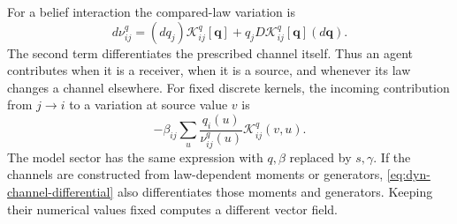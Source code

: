 For a belief interaction the compared-law variation is
\begin{equation}
 d\nu^q_{ij}
 =(dq_j)\mathcal K^q_{ij}[\mathbf q]
  +q_jD\mathcal K^q_{ij}[\mathbf q](d\mathbf q).
 \label{eq:dyn-channel-differential}
\end{equation}
The second term differentiates the prescribed channel itself. Thus an agent contributes when it is a receiver, when it is a source, and whenever its law changes a channel elsewhere. For fixed discrete kernels, the incoming contribution from $j\to i$ to a variation at source value $v$ is
\begin{equation}
 -\beta_{ij}\sum_u
 \frac{q_i(u)}{\nu^q_{ij}(u)}\mathcal K^q_{ij}(v,u).
 \label{eq:dyn-incoming}
\end{equation}
The model sector has the same expression with $q,\beta$ replaced by $s,\gamma$. If the channels are constructed from law-dependent moments or generators, \cref{eq:dyn-channel-differential} also differentiates those moments and generators. Keeping their numerical values fixed computes a different vector field.

